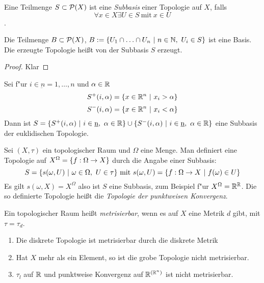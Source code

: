 \begin{dfn}
    Eine Teilmenge $S\subset \mathcal{P}(X)$ ist eine \emph{Subbasis} einer Topologie auf $X$,
    falls
        \[ \forall x\in X \exists U\in S \ \text{mit}\ x\in U \].
    \begin{stz}
        Die Teilmenge $B \subset \mathcal{P}(X)$, $B := \mdef[U_1 \cap \ldots \cap U_n]{n\in \N,\ U_i \in S}$
        ist eine Basis. Die erzeugte Topologie hei\ss{}t von der Subbasis $S$ erzeugt.
        \begin{proof}
         Klar
        \end{proof}
    \end{stz}
    \begin{bsp}
        Sei f"ur $i\in \underbar{n} = {1, \ldots, n}$ und $\alpha\in\mathbb{R}$
        \[S^+(i, \alpha)=\mdef[x\in\R^n]{x_i>\alpha}\]
        \[S^-(i, \alpha)=\mdef[x\in\R^n]{x_i<\alpha}\]
        Dann ist $S=\mdef[S^+(i,\alpha)]{i\in\underbar n,\ \alpha\in\R}
                    \cup \mdef[S^-(i,\alpha)]{i\in\underbar n,\ \alpha\in\R}$
        eine Subbasis der euklidischen Topologie.
    \end{bsp}
    \begin{bsp}
        Sei $(X,\tau)$ ein topologischer Raum und $\Omega$ eine Menge. Man
        definiert eine Topologie auf $X^\Omega = \mdef{f:\Omega\to X}$ durch die
        Angabe einer Subbasis:
        \[S=\mdef[s(\omega, U)]{\omega\in\Omega,\ U\in\tau} \text{ mit }
          s(\omega, U)=\mdef[f:\Omega\to X]{f(\omega)\in U}\]
        Es gilt $s(\omega, X)=X^\Omega$ also ist $S$ eine Subbasis, zum Beispiel
        f"ur $X^\Omega = \mathbb{R}^{\mathbb{R}}$. Die so definierte Topologie hei\ss{}t die
        \emph{Topologie der punktweisen Konvergenz}.
    \end{bsp}
\end{dfn}

\begin{dfn}
    Ein topologischer Raum hei\ss{}t \emph{metrisierbar}, wenn es auf $X$ eine
    Metrik $d$ gibt, mit $\tau=\tau_d$.
    \begin{bsp}
        \begin{enumerate}
         \item Die diskrete Topologie ist metrisierbar durch die diskrete Metrik
         \item Hat $X$ mehr als ein Element, so ist die grobe Topologie nicht
            metrisierbar.
         \item $\tau_l$ auf $\mathbb{R}$ und punktweise Konvergenz auf $\mathbb{R}^{(\mathbb{R}^n)}$ ist
            nicht metrisierbar.
        \end{enumerate}
    \end{bsp}
\end{dfn}

